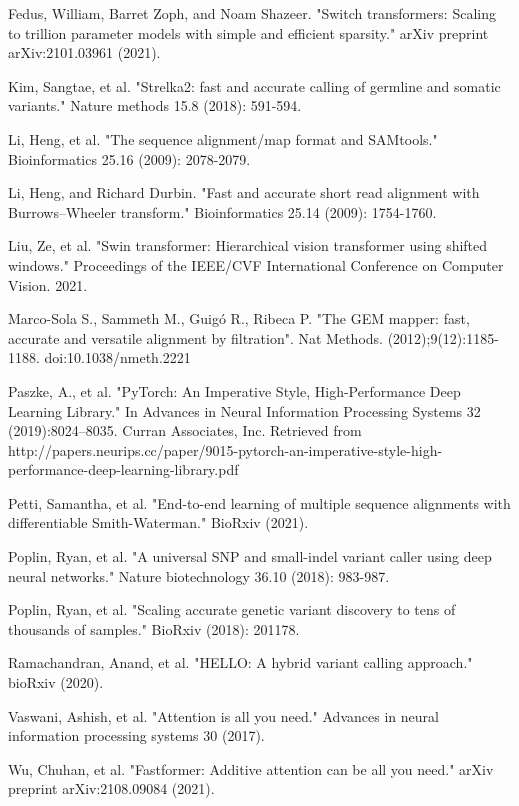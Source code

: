 \documentclass[]{article}
\begin{document}
\vspace{8pt}
Fedus, William, Barret Zoph, and Noam Shazeer. "Switch transformers: Scaling to trillion parameter models with simple and efficient sparsity." arXiv preprint arXiv:2101.03961 (2021).

\vspace{8pt}
Kim, Sangtae, et al. "Strelka2: fast and accurate calling of germline and somatic variants." Nature methods 15.8 (2018): 591-594.

\vspace{8pt}
Li, Heng, et al. "The sequence alignment/map format and SAMtools." Bioinformatics 25.16 (2009): 2078-2079.

\vspace{8pt}
Li, Heng, and Richard Durbin. "Fast and accurate short read alignment with Burrows–Wheeler transform." Bioinformatics 25.14 (2009): 1754-1760.

\vspace{8pt}
Liu, Ze, et al. "Swin transformer: Hierarchical vision transformer using shifted windows." Proceedings of the IEEE/CVF International Conference on Computer Vision. 2021.

\vspace{8pt}
Marco-Sola S., Sammeth M., Guigó R., Ribeca P. "The GEM mapper: fast, accurate and versatile alignment by filtration". Nat Methods. (2012);9(12):1185-1188. doi:10.1038/nmeth.2221

 
\vspace{8pt}
Paszke, A., et al. "PyTorch: An Imperative Style, High-Performance Deep Learning Library." In Advances in Neural Information Processing Systems 32 (2019):8024–8035. Curran Associates, Inc. Retrieved from http://papers.neurips.cc/paper/9015-pytorch-an-imperative-style-high-performance-deep-learning-library.pdf

\vspace{8pt}
Petti, Samantha, et al. "End-to-end learning of multiple sequence alignments with differentiable Smith-Waterman." BioRxiv (2021).

\vspace{8pt}
Poplin, Ryan, et al. "A universal SNP and small-indel variant caller using deep neural networks." Nature biotechnology 36.10 (2018): 983-987.

\vspace{8pt}
Poplin, Ryan, et al. "Scaling accurate genetic variant discovery to tens of thousands of samples." BioRxiv (2018): 201178.

\vspace{8pt}
Ramachandran, Anand, et al. "HELLO: A hybrid variant calling approach." bioRxiv (2020).
 

\vspace{8pt}
Vaswani, Ashish, et al. "Attention is all you need." Advances in neural information processing systems 30 (2017).


\vspace{8pt}
Wu, Chuhan, et al. "Fastformer: Additive attention can be all you need." arXiv preprint arXiv:2108.09084 (2021).
\end{document}
